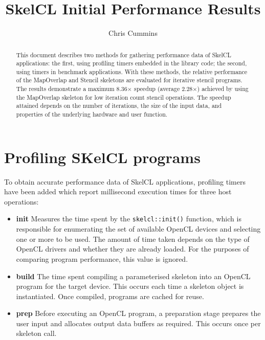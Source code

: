 
\title{SkelCL Initial Performance Results}

\author{Chris Cummins}





\maketitle

\begin{abstract}
  \noindent
  This document describes two methods for gathering performance data
  of SkelCL applications: the first, using profiling timers embedded
  in the library code; the second, using timers in benchmark
  applications. With these methods, the relative performance of the
  MapOverlap and Stencil skeletons are evaluated for iterative stencil
  programs. The results demonstrate a maximum 8.36$\times$ speedup
  (average 2.28$\times$) achieved by using the MapOverlap skeleton for
  low iteration count stencil operations. The speedup attained depends
  on the number of iterations, the size of the input data, and
  properties of the underlying hardware and user function.
\end{abstract}

\section{Profiling SKelCL programs}

To obtain accurate performance data of SkelCL applications, profiling
timers have been added which report millisecond execution times for
three host operations:

\begin{itemize}
\item \textbf{init} Measures the time spent by the
  \texttt{skelcl::init()} function, which is responsible for
  enumerating the set of available OpenCL devices and selecting one or
  more to be used. The amount of time taken depends on the type of
  OpenCL drivers and whether they are already loaded. For the purposes
  of comparing program performance, this value is ignored.

\item \textbf{build} The time spent compiling a parameterised skeleton
  into an OpenCL program for the target device. This occurs each time
  a skeleton object is instantiated. Once compiled, programs are
  cached for reuse.

\item \textbf{prep} Before executing an OpenCL program, a preparation
  stage prepares the user input and allocates output data buffers as
  required. This occurs once per skeleton call.
\end{itemize}

